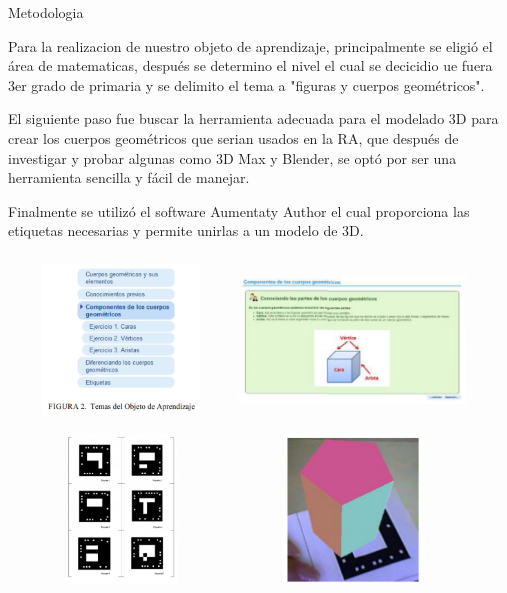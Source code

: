 \documentclass[11pt]{beamer}
\begin{document}
\begin{frame}{Metodologia}

Para la realizacion de nuestro objeto de aprendizaje, principalmente se eligió el área de matematicas, después se determino el nivel el cual se decicidio ue fuera 3er grado de primaria y se delimito el tema a "figuras y cuerpos geométricos".

El siguiente paso fue buscar la herramienta adecuada para el modelado 3D para crear los cuerpos geométricos que serian usados en la RA, que después de investigar y probar algunas como 3D Max y Blender, se optó por ser una herramienta sencilla y fácil de manejar.

Finalmente se utilizó el software Aumentaty Author el cual proporciona las etiquetas necesarias y permite unirlas a un modelo de 3D.
\end{frame}

\begin{frame}
\frametitle{}
\center 
\includegraphics[width=6cm, height=4cm]{img/imagen2.png}
\includegraphics[width=6cm, height=4cm]{img/imagen3.png}

\end{frame}

\begin{frame}
\center 
\includegraphics[width=6cm, height=4cm]{img/imagen4.png}
\includegraphics[width=6cm, height=4cm]{img/imagen5.png}

\end{frame}
\end{document}
